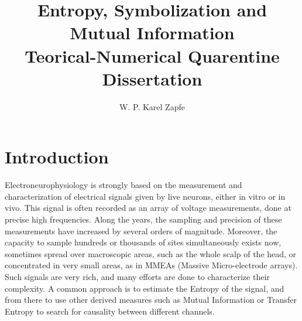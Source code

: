 \documentclass{article}
\title{Entropy, Symbolization and Mutual Information \\
Teorical-Numerical Quarentine Dissertation}
\author{ W. P. Karel Zapfe}
\begin{document}
\maketitle

\section{Introduction}

Electroneurophysiology is strongly based on the measurement and characterization of electrical signals given by live neurons, either in vitro or in vivo. This signal is often recorded as an array of voltage measurements, done at precise high frequencies. Along the years, the sampling and precision of these measurements have increased by several orders of magnitude. Moreover, the capacity to sample hundreds or thousands of sites simultaneously exists now, sometimes spread over macroscopic areas, such as the whole scalp of the head, or concentrated in very small areas, as in MMEAs (Massive Micro-electrode arrays). Such signals are very rich, and many efforts are done to characterize their complexity. A common approach is to estimate the Entropy of the signal, and from there to use other derived measures such as Mutual Information or Transfer Entropy to search for causality between different channels.
\end{document}
